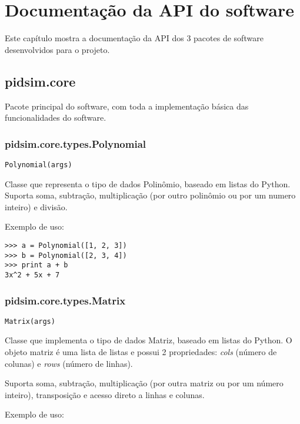 \chapter{Documentação da \acs{API} do software}

    Este capítulo mostra a documentação da \ac{API} dos 3 pacotes de
    software desenvolvidos para o projeto.


\section{pidsim.core}

    Pacote principal do software, com toda a implementação básica das 
    funcionalidades do software.

\subsection{pidsim.core.types.Polynomial}

    \begin{verbatim}
Polynomial(args)\end{verbatim}

    Classe que representa o tipo de dados Polinômio, baseado em listas
    do Python. Suporta soma, subtração, multiplicação (por outro polinômio
    ou por um numero inteiro) e divisão.
    
    Exemplo de uso:

    \begin{verbatim}
>>> a = Polynomial([1, 2, 3])
>>> b = Polynomial([2, 3, 4])
>>> print a + b
3x^2 + 5x + 7\end{verbatim}
    
\subsection{pidsim.core.types.Matrix}

    \begin{verbatim}
Matrix(args)\end{verbatim}

    Classe que implementa o tipo de dados Matriz, baseado em listas do
    Python. O objeto matriz é uma lista de listas e possui 2 propriedades:
    \textit{cols} (número de colunas) e \textit{rows} (número de linhas).
    
    Suporta soma, subtração, multiplicação (por outra matriz ou por um
    número inteiro), transposição e acesso direto a linhas e colunas.
    
    Exemplo de uso:
    
